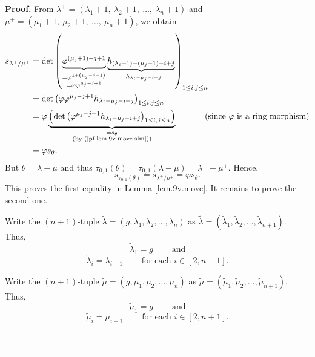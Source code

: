 \documentclass[numbers=enddot,12pt,final,onecolumn,notitlepage]{scrartcl}%
\theoremstyle{definition}
\newenvironment{proof}[1][Proof]{\noindent\textbf{#1.} }{\ \rule{0.5em}{0.5em}}
\begin{document}
\begin{enumerate}
\begin{proof}
From $\lambda^{+}=\left(  \lambda_{1}+1,\ \lambda_{2}+1,\ \ldots,\ \lambda
_{n}+1\right)  $ and $\mu^{+}=\left(  \mu_{1}+1,\ \mu_{2}+1,\ \ldots,\ \mu
_{n}+1\right)  $, we obtain%
\begin{align*}
s_{\lambda^{+}/\mu^{+}}  &  =\det\left(  \underbrace{\varphi^{\left(  \mu
_{j}+1\right)  -j+1}}_{\substack{=\varphi^{1+\left(  \mu_{j}-j+1\right)
}\\=\varphi\varphi^{\mu_{j}-j+1}}}\underbrace{h_{\left(  \lambda_{i}+1\right)
-\left(  \mu_{j}+1\right)  -i+j}}_{=h_{\lambda_{i}-\mu_{j}-i+j}}\right)
_{1\leq i,j\leq n}\\
&  =\det\left(  \varphi\varphi^{\mu_{j}-j+1}h_{\lambda_{i}-\mu_{j}%
-i+j}\right)  _{1\leq i,j\leq n}\\
&  =\varphi\underbrace{\left(  \det\left(  \varphi^{\mu_{j}-j+1}h_{\lambda
_{i}-\mu_{j}-i+j}\right)  _{1\leq i,j\leq n}\right)  }_{\substack{=s_{\theta
}\\\text{(by (\ref{pf.lem.9v.move.slm}))}}}\ \ \ \ \ \ \ \ \ \ \left(
\text{since }\varphi\text{ is a ring morphism}\right) \\
&  =\varphi s_{\theta}.
\end{align*}
But $\theta=\lambda-\mu$ and thus $\tau_{0,1}\left(  \theta\right)
=\tau_{0,1}\left(  \lambda-\mu\right)  =\lambda^{+}-\mu^{+}$. Hence,%
\[
s_{\tau_{0,1}\left(  \theta\right)  }=s_{\lambda^{+}/\mu^{+}}=\varphi
s_{\theta}.
\]
This proves the first equality in Lemma \ref{lem.9v.move}. It remains to prove
the second one.

Write the $\left(  n+1\right)  $-tuple $\widetilde{\lambda}=\left(
g,\lambda_{1},\lambda_{2},\ldots,\lambda_{n}\right)  $ as $\widetilde{\lambda
}=\left(  \widetilde{\lambda}_{1},\widetilde{\lambda}_{2},\ldots
,\widetilde{\lambda}_{n+1}\right)  $. Thus,%
\begin{equation}
\widetilde{\lambda}_{1}=g\ \ \ \ \ \ \ \ \ \ \text{and}
\label{pf.lem.9v.move.lt1}%
\end{equation}%
\begin{equation}
\widetilde{\lambda}_{i}=\lambda_{i-1}\ \ \ \ \ \ \ \ \ \ \text{for each }%
i\in\left[  2,n+1\right]  . \label{pf.lem.9v.move.lti}%
\end{equation}


Write the $\left(  n+1\right)  $-tuple $\widetilde{\mu}=\left(  g,\mu_{1}%
,\mu_{2},\ldots,\mu_{n}\right)  $ as $\widetilde{\mu}=\left(  \widetilde{\mu
}_{1},\widetilde{\mu}_{2},\ldots,\widetilde{\mu}_{n+1}\right)  $. Thus,%
\begin{equation}
\widetilde{\mu}_{1}=g\ \ \ \ \ \ \ \ \ \ \text{and} \label{pf.lem.9v.move.mt1}%
\end{equation}%
\begin{equation}
\widetilde{\mu}_{i}=\mu_{i-1}\ \ \ \ \ \ \ \ \ \ \text{for each }i\in\left[
2,n+1\right]  . \label{pf.lem.9v.move.mti}%
\end{equation}



\end{proof}
\end{enumerate}
\end{document}
